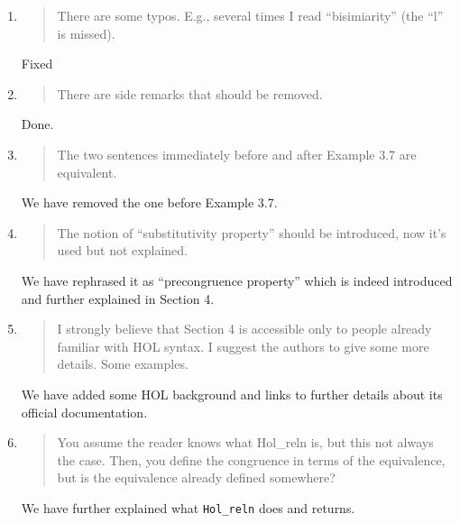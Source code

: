 \begin{enumerate}

\item \begin{quote}
    There are some typos. E.g., several times I read “bisimiarity” (the “l” is missed).
  \end{quote}

  \Mark
  Fixed %
  
\item \begin{quote}
    There are side remarks that should be removed.
  \end{quote}

  \Mark
 Done.  %
  
\item \begin{quote}
    The two sentences immediately before and after Example 3.7 are equivalent.
  \end{quote}

   \Mark
 We have removed the one before Example 3.7.

\item \begin{quote}
    The notion of “substitutivity property” should be introduced, now it’s used but not explained.
  \end{quote}
   \Mark
  We have rephrased it as ``precongruence property'' which is indeed
  introduced and further explained in Section 4.

\item \begin{quote}
    I strongly believe that Section 4 is accessible only to people
    already familiar with HOL syntax. I suggest the authors to give
    some more details. Some examples.
  \end{quote}

  \Mark
  We have added some HOL background and links to further details about its official documentation.
  
\item \begin{quote}
    You assume the reader knows what Hol_reln is, but this not always the case. 
Then, you define the congruence in terms of the equivalence, but is
the equivalence already defined somewhere?
  \end{quote}

  \Mark
  We have  further explained what  \texttt{Hol_reln} does and returns.
  

\end{enumerate}

